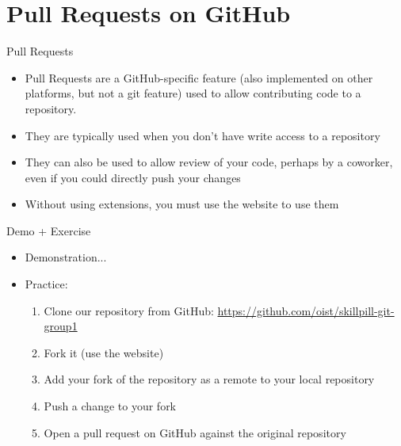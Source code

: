 \documentclass{beamer}
\begin{document}
\section{Pull Requests on GitHub}
\begin{frame}{Pull Requests}
  \begin{itemize}
    \item Pull Requests are a GitHub-specific feature (also implemented on other platforms, but not a git feature) used to allow contributing code to a repository.
    \item They are typically used when you don\rq{}t have write access to a repository
    \item They can also be used to allow review of your code, perhaps by a coworker, even if you could directly push your changes
    \item Without using extensions, you must use the website to use them
  \end{itemize}
\end{frame}

\begin{frame}
  \begin{block}{Demo + Exercise}
    \begin{itemize}
      \item Demonstration...
      \item Practice:
      \begin{enumerate}
        \item Clone our repository from GitHub: \url{https://github.com/oist/skillpill-git-group1}
        \item Fork it (use the website)
        \item Add your fork of the repository as a remote to your local repository
        \item Push a change to your fork
        \item Open a pull request on GitHub against the original repository
      \end{enumerate}
    \end{itemize}
  \end{block}
\end{frame}
\end{document}

